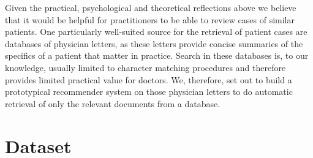 
Given the practical, psychological and theoretical reflections above we believe that it would be helpful for practitioners to be able to review cases of similar patients. One particularly well-suited source for the retrieval of patient cases are databases of physician letters, as these letters provide concise summaries of the specifics of a patient that matter in practice. Search in these databases is, to our knowledge, usually limited to character matching procedures and therefore provides limited practical value for doctors. We, therefore, set out to build a prototypical recommender system on those physician letters to do automatic retrieval of only the relevant documents from a database.


\section{Dataset}

